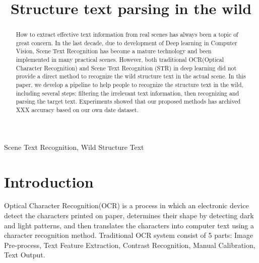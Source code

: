 \documentclass{article}
\begin{document}
\sloppy

\def\x{{\mathbf x}}
\def\L{{\cal L}}


\title{Structure text parsing in the wild}
%
\address{}


\maketitle


%
\begin{abstract}

How to extract effective text information from real scenes has always been a topic of great concern.
In the last decade, due to development of Deep learning in Computer Vision, Scene Text Recognition has become a mature technology and been implemented in many practical scenes. However, both traditional OCR(Optical Character Recognition) and Scene Text Recognition (STR) in deep learning did not provide a direct method to recognize the wild structure text in the actual scene. In this paper, we develop a pipeline to help people to recognize the structure text in the wild, including several steps: filtering the irrelevant text information, then recognizing and parsing the target text. Experiments showed that our proposed methods has archived XXX accuracy based on our own date dataset.
 
\end{abstract}
%
\begin{keywords}
Scene Text Recognition, Wild Structure Text
\end{keywords}
%
\section{Introduction}
\label{sec:intro}

Optical Character Recognition(OCR) is a process in which an electronic device detect the characters printed on paper, determines their shape by detecting dark and light patterns, and then translates the characters into computer text using a character recognition method. Traditional OCR system consist of 5 parts: Image Pre-process, Text Feature Extraction, Contrast Recognition, Manual Calibration, Text Output.
\end{document}
